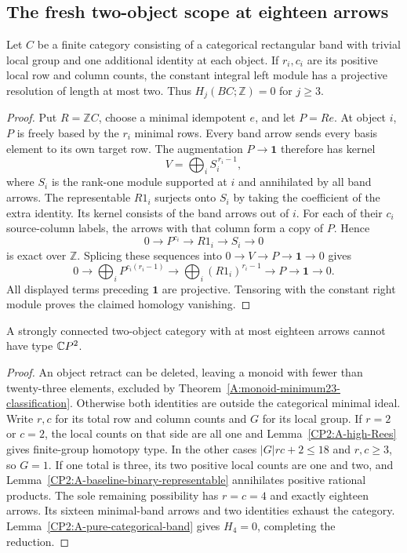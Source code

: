 \subsection{The fresh two-object scope at eighteen arrows}

\begin{lemma}
\label{CP2:A-pure-categorical-band}
Let $C$ be a finite category consisting of a categorical
rectangular band with trivial local group and one additional
identity at each object. If $r_i,c_i$ are its positive local
row and column counts, the constant integral left module
has a projective resolution of length at most two. Thus
$H_j(BC;\mathbb Z)=0$ for $j\geq3$.
\end{lemma}
\begin{proof}
Put $R=\mathbb ZC$, choose a minimal idempotent $e$, and
let $P=Re$. At object $i$, $P$ is freely based by the $r_i$
minimal rows. Every band arrow sends every basis element
to its own target row. The augmentation $P\to\mathbf1$
therefore has kernel
\[
 V=\bigoplus_i S_i^{\,r_i-1},
\]
where $S_i$ is the rank-one module supported at $i$ and
annihilated by all band arrows. The representable $R1_i$
surjects onto $S_i$ by taking the coefficient of the extra
identity. Its kernel consists of the band arrows out of $i$.
For each of their $c_i$ source-column labels, the arrows
with that column form a copy of $P$. Hence
\[
 0\longrightarrow P^{c_i}\longrightarrow R1_i
   \longrightarrow S_i\longrightarrow0
\]
is exact over $\mathbb Z$. Splicing these sequences into
$0\to V\to P\to\mathbf1\to0$ gives
\[
 0\longrightarrow\bigoplus_i P^{c_i(r_i-1)}
 \longrightarrow\bigoplus_i(R1_i)^{r_i-1}
 \longrightarrow P\longrightarrow\mathbf1\longrightarrow0.
\]
All displayed terms preceding $\mathbf1$ are projective.
Tensoring with the constant right module proves the claimed
homology vanishing.
\end{proof}

\begin{proposition}
\label{CP2:A-strong-two-eighteen}
A strongly connected two-object category with at most
eighteen arrows cannot have type $\mathbb{C}P^2$.
\end{proposition}
\begin{proof}
An object retract can be deleted, leaving a monoid with
fewer than twenty-three elements, excluded by
Theorem~\ref{A:monoid-minimum23-classification}. Otherwise
both identities are outside the categorical minimal ideal.
Write $r,c$ for its total row and column counts and $G$ for
its local group. If $r=2$ or $c=2$, the local counts on that
side are all one and Lemma~\ref{CP2:A-high-Rees} gives
finite-group homotopy type. In the other cases
$|G|rc+2\leq18$ and $r,c\geq3$, so $G=1$.
If one total is three, its two positive local counts are
one and two, and Lemma~\ref{CP2:A-baseline-binary-representable}
annihilates positive rational products. The sole remaining
possibility has $r=c=4$ and exactly eighteen arrows. Its
sixteen minimal-band arrows and two identities exhaust the
category. Lemma~\ref{CP2:A-pure-categorical-band} gives
$H_4=0$, completing the reduction.
\end{proof}


